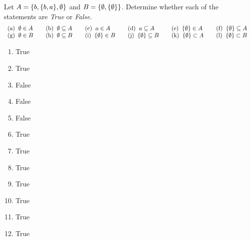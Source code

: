 \begin{questions}
 Let $A = \{b, \{b, a\}, \emptyset\}$ and $B = \{ \emptyset, \{\emptyset\} \}$. Determine whether each of the statements are \textit{True} or \textit{False}.
\[ \begin{array}{llllll}
    \mathrm{(a)}\;\;  \emptyset \in A  \;\;&\;\; 
    \mathrm{(b)}\;\;  \emptyset \subseteq A \;\;&\;\;
    \mathrm{(c)}\;\; a \in A \;\;&\;\; 
    \mathrm{(d)}\;\; a \subseteq A \;\;&\;\;
    \mathrm{(e)}\;\; \{ \emptyset \} \in A \;\;&\;\; 
    \mathrm{(f)}\;\; \{ \emptyset \} \subseteq A \\
    \mathrm{(g)}\;\; \emptyset \in B  \;\;&\;\; 
    \mathrm{(h)}\;\; \emptyset \subseteq B \;\;&\;\;
    \mathrm{(i)}\;\; \{\emptyset\} \in B \;\;&\;\; 
    \mathrm{(j)}\;\; \{ \emptyset \} \subseteq B \;\;&\;\;
    \mathrm{(k)}\;\; \{ \emptyset  \} \subset A \;\;&\;\; 
    \mathrm{(l)}\;\; \{ \emptyset  \} \subset B 
   \end{array}\]
   \ifprintanswers
        \vspace{-25pt}
    \fi
    \begin{solution}
        \begin{enumerate}[label=(\alph*),itemsep=2pt,parsep=0pt,topsep=0pt,partopsep=0pt]
            \item True  %
            \item True 
            \item False 
            \item False  %
            \item False 
            \item True 
            \item True   %
            \item True 
            \item True
            \item True     %
            \item True 
            \item True 
        \end{enumerate}
    \end{solution}



\end{questions}
